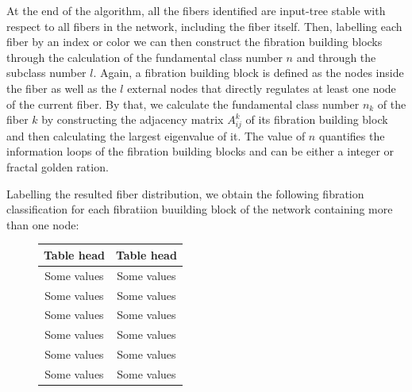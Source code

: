 \documentclass[12pt]{diazessay} %
\begin{document}
At the end of the algorithm, all the fibers identified are input-tree stable with respect to all fibers in the network, including the fiber itself. Then, labelling each fiber by an index or color we can then construct the fibration building blocks through the calculation of the fundamental class number $n$ and through the subclass number $l$. Again, a fibration building block is defined as the nodes inside the fiber as well as the $l$ external nodes that directly regulates at least one node of the current fiber. By that, we calculate the fundamental class number $n_k$ of the fiber $k$ by constructing the adjacency matrix $A_{ij}^{k}$ of its fibration building block and then calculating the largest eigenvalue of it. The value of $n$ quantifies the information loops of the fibration building blocks and can be either a integer or fractal golden ration.

Labelling the resulted fiber distribution, we obtain the following fibration classification for each fibratiion buuilding block of the network containing more than one node:

\begin{figure}[!ht]
    \centering
    \qquad
    \begin{tabular}[b]{cc}\hline
      Table head & Table head \\ \hline
      Some values & Some values \\
      Some values & Some values \\
      Some values & Some values \\
      Some values & Some values \\
      Some values & Some values \\
      Some values & Some values \\ \hline
    \end{tabular}
\end{figure}
\end{document}
